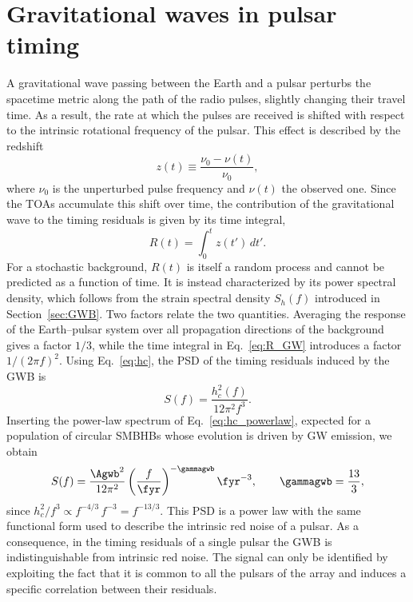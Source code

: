 \section{Gravitational waves in pulsar timing} \label{sec:timingGW}

A gravitational wave passing between the Earth and a pulsar perturbs the
spacetime metric along the path of the radio pulses, slightly changing their
travel time. As a result, the rate at which the pulses are received is shifted
with respect to the intrinsic rotational frequency of the pulsar. This effect is
described by the redshift~\cite{Detweiler1979, Maggiore2018, Taylor2021}
\begin{equation}
    z(t) \equiv \frac{\nu_0 - \nu(t)}{\nu_0},
    \label{eq:redshift}
\end{equation}
where $\nu_0$ is the unperturbed pulse frequency and $\nu(t)$ the observed one.
Since the TOAs accumulate this shift over time, the contribution of the
gravitational wave to the timing residuals is given by its time integral,
\begin{equation}
    R(t) = \int_0^t z(t')\,dt'.
    \label{eq:R_GW}
\end{equation}
For a stochastic background, $R(t)$ is itself a random process and cannot be
predicted as a function of time. It is instead characterized by its power
spectral density, which follows from the strain spectral density $S_h(f)$
introduced in Section~\ref{sec:GWB}. Two factors relate the two quantities.
Averaging the response of the Earth--pulsar system over all propagation
directions of the background gives a factor $1/3$, while the time integral in
Eq.~\eqref{eq:R_GW} introduces a factor $1/(2\pi f)^2$. Using
Eq.~\eqref{eq:hc}, the PSD of the timing residuals induced by the GWB is~\cite{Taylor2021}
\begin{equation}
    S(f) = \frac{h_c^2(f)}{12\pi^2 f^3}.
    \label{eq:PSD_hc}
\end{equation}
Inserting the power-law spectrum of Eq.~\eqref{eq:hc_powerlaw}, expected for a
population of circular SMBHBs whose evolution is driven by GW emission, we obtain
\begin{equation}
    S(f) = \frac{\Agwb^2}{12\pi^2}\left(\frac{f}{\fyr}\right)^{-\gammagwb}\fyr^{-3},
    \qquad \gammagwb = \frac{13}{3},
    \label{eq:PSD_GWB}
\end{equation}
since $h_c^2/f^3 \propto f^{-4/3}\,f^{-3} = f^{-13/3}$.
This PSD is a power law with the same functional form used to describe the
intrinsic red noise of a pulsar. As a consequence, in the timing residuals of a
single pulsar the GWB is indistinguishable from intrinsic red noise. The signal
can only be identified by exploiting the fact that it is common to all the
pulsars of the array and induces a specific correlation between their residuals.

